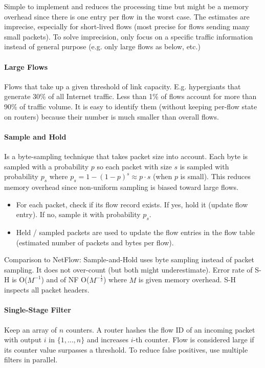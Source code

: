 Simple to implement and reduces the processing time but might be a memory overhead since there is one entry per flow in the worst case. The estimates are imprecise, especially for short-lived flows (most precise for flows sending many small packets). To solve imprecision, only focus on a specific traffic information instead of general purpose (e.g. only large flows as below, etc.)

\paragraph{Large Flows}
Flows that take up a given threshold of link capacity. E.g. hypergiants that generate 30\% of all Internet traffic. Less than 1\% of flows account for more than 90\% of traffic volume. It is easy to identify them (without keeping per-flow state on routers) because their number is much smaller than overall flows.

\paragraph{Sample and Hold}
Is a byte-sampling technique that takes packet size into account. Each byte is sampled with a probability $p$ so each packet with size $s$ is sampled with probability $p_s$ where $p_s = 1-(1-p)^s \approx p \cdot s$ (when $p$ is small). This reduces memory overhead since non-uniform sampling is biased toward large flows.

\begin{itemize}
    \item For each packet, check if its flow record exists. If yes, hold it (update flow entry). If no, sample it with probability $p_s$.
    \item Held / sampled packets are used to update the flow entries in the flow table (estimated number of packets and bytes per flow).
\end{itemize}

Comparison to NetFlow: Sample-and-Hold uses byte sampling instead of packet sampling. It does not over-count (but both might underestimate). Error rate of S-H is O($M^{-1}$) and of NF O($M^{-\frac{1}{2}}$) where $M$ is given memory overhead. S-H inspects all packet headers.

\paragraph{Single-Stage Filter}
Keep an array of $n$ counters. A router hashes the flow ID of an incoming packet with output $i$ in $\{1, ..., n\}$ and increases $i$-th counter. Flow is considered large if its counter value surpasses a threshold. To reduce false positives, use multiple filters in parallel.

